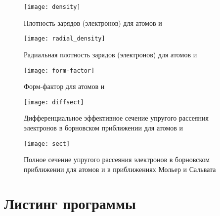   \begin{figure}[h!]
    \centering
    \texttt{[image: density]}
    \caption{Плотность зарядов (электронов) для атомов
      \fiat и \seat}
    \label{fig:density}
  \end{figure}

  \begin{figure}[h!]
    \centering
    \texttt{[image: radial\_density]}
    \caption{Радиальная плотность зарядов (электронов)
      для атомов \fiat и \seat}
    \label{fig:radial}
  \end{figure}

  \begin{figure}[h!]
    \centering
    \texttt{[image: form-factor]}
    \caption{Форм-фактор для атомов \fiat и \seat}
    \label{fig:factor}
  \end{figure}

  \begin{figure}[h!]
    \centering
    \texttt{[image: diffsect]}
    \caption{Дифференциальное эффективное сечение упругого
      рассеяния электронов в борновском приближении для атомов
      \fiat и \seat}
    \label{fig:diff}
  \end{figure}

  \begin{figure}[h!]
    \centering
    \texttt{[image: sect]}
    \caption{Полное сечение упругого рассеяния электронов в
      борновском приближении для атомов \fiat и \seat в
      приближениях Мольер и Сальвата}
    \label{fig:sect}
  \end{figure}

  \clearpage
  \section{Листинг программы}
  \label{sec:code}
  



